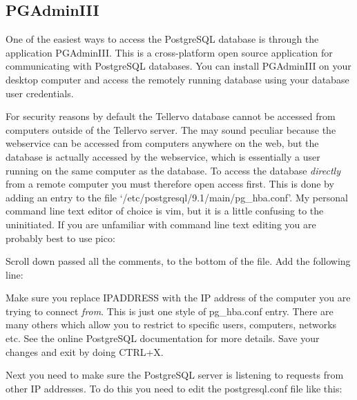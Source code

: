 
\subsection{PGAdminIII}
One of the easiest ways to access the PostgreSQL database is through the application PGAdminIII.  This is a cross-platform open source application for communicating with PostgreSQL databases.  You can install PGAdminIII on your desktop computer and access the remotely running database using your database user credentials.  

For security reasons by default the Tellervo database cannot be accessed from computers outside of the Tellervo server.  The may sound peculiar because the webservice can be accessed from computers anywhere on the web, but the database is actually accessed by the webservice, which is essentially a user running on the same computer as the database.  To access the database \emph{directly} from a remote computer you must therefore open access first.  This is done by adding an entry to the file `/etc/postgresql/9.1/main/pg\_hba.conf'.  My personal command line text editor of choice is vim, but it is a little confusing to the uninitiated.  If you are unfamiliar with command line text editing you are probably best to use pico:


Scroll down passed all the comments, to the bottom of the file.  Add the following line:


Make sure you replace IPADDRESS with the IP address of the computer you are trying to connect \emph{from}. This is just one style of pg\_hba.conf entry.  There are many others which allow you to restrict to specific users, computers, networks etc.  See the online PostgreSQL documentation for more details.  Save your changes and exit by doing CTRL+X.  

Next you need to make sure the PostgreSQL server is listening to requests from other IP addresses.  To do this you need to edit the postgresql.conf file like this:


